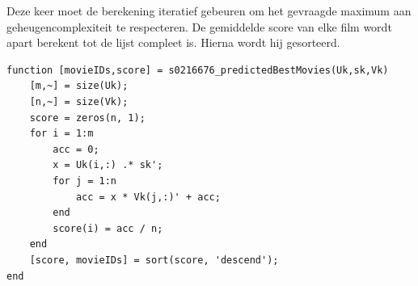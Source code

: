 
Deze keer moet de berekening iteratief gebeuren om het gevraagde maximum aan geheugencomplexiteit te respecteren. De gemiddelde score van elke film wordt apart berekent tot de lijst compleet is. Hierna wordt hij gesorteerd.

\begin{lstlisting}
function [movieIDs,score] = s0216676_predictedBestMovies(Uk,sk,Vk)
    [m,~] = size(Uk); 
    [n,~] = size(Vk);
    score = zeros(n, 1);
    for i = 1:m
        acc = 0;
        x = Uk(i,:) .* sk';
        for j = 1:n
            acc = x * Vk(j,:)' + acc;
        end
        score(i) = acc / n;
    end
    [score, movieIDs] = sort(score, 'descend');
end
\end{lstlisting}


\thispagestyle{empty}

